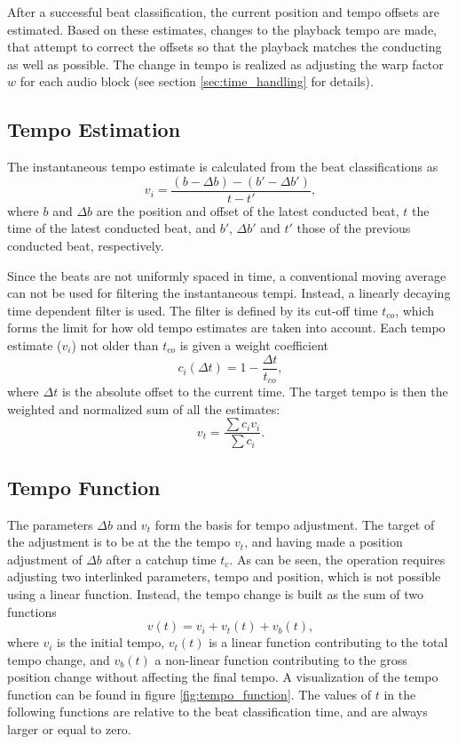 After a successful beat classification,
the current position and tempo offsets
are estimated.
Based on these estimates,
changes to the playback tempo are made,
that attempt to correct the offsets
so that the playback matches the conducting
as well as possible.
The change in tempo is realized as adjusting
the warp factor $w$ for each audio block
(see section \ref{sec:time_handling} for details).

\subsection{Tempo Estimation}

The instantaneous tempo estimate is calculated from
the beat classifications as
\begin{equation}
v_i = \frac{(b - \Delta b) - (b' - \Delta b')}{t - t'},
\end{equation}
where $b$ and $\Delta b$ are the position and offset of
the latest conducted beat,
$t$ the time of the latest conducted beat,
and $b'$, $\Delta b'$ and $t'$ those of
the previous conducted beat, respectively.

Since the beats are not uniformly spaced in time,
a conventional moving average can not be used
for filtering the instantaneous tempi.
Instead, a linearly decaying time dependent filter is used.
The filter is defined by its cut-off time $t_{co}$,
which forms the limit for how old tempo estimates
are taken into account.
Each tempo estimate ($v_i$) not older than $t_{co}$ is given a weight coefficient
\begin{equation}
c_i(\Delta t) = 1 - \frac{\Delta t}{t_{co}},
\label{eq:tempo_filter_weight_coef}
\end{equation}
where $\Delta t$ is the absolute offset to the current time.
The target tempo is then the
weighted and normalized sum of all the estimates:
\begin{equation}
v_t = \frac{\sum c_i v_i}{\sum c_i}.
\end{equation}


\subsection{Tempo Function}
\label{sec:tempo_function}

The parameters $\Delta b$ and $v_t$
form the basis for tempo adjustment.
The target of the adjustment is to be
at the the tempo $v_t$,
and having made a position adjustment of $\Delta b$
after a catchup time $t_c$.
As can be seen,
the operation requires adjusting two interlinked parameters,
tempo and position,
which is not possible using a linear function.
Instead, the tempo change is built as the sum of two functions
\begin{equation}
v(t) = v_i + v_t(t) + v_b(t),
\end{equation}
where $v_i$ is the initial tempo,
$v_t(t)$ is a linear function
contributing to the total tempo change,
and $v_b(t)$ a non-linear function contributing
to the gross position change
without affecting the final tempo.
A visualization of the tempo function can be found
in figure \ref{fig:tempo_function}.
The values of $t$ in the following functions are relative to the
beat classification time,
and are always larger or equal to zero.

